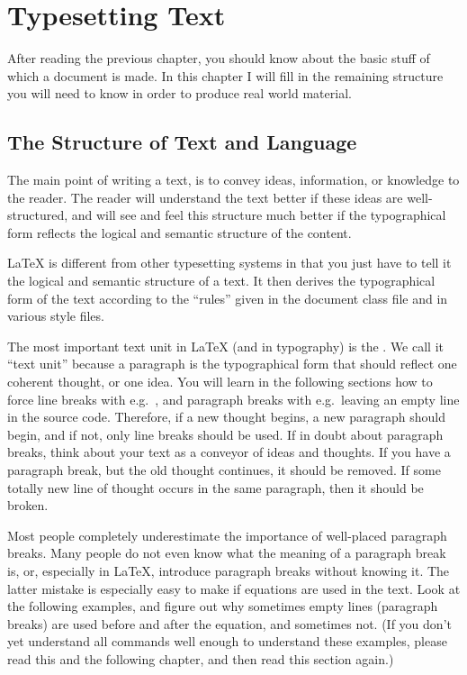 \chapter{Typesetting Text}

\begin{intro}
  After reading the previous chapter, you should know about the basic
  stuff of which a \LaTeXe{} document is made. In this chapter I
  will fill in the remaining structure you will need to know in order
  to produce real world material.
\end{intro}

\section{The Structure of Text and Language}
The main point of writing a text, is to convey ideas, information, or
knowledge to the reader.  The reader will understand the text better
if these ideas are well-structured, and will see and feel this
structure much better if the typographical form reflects the logical
and semantic structure of the content.

\LaTeX{} is different from other typesetting systems in that you just
have to tell it the logical and semantic structure of a text.  It
then derives the typographical form of the text according to the
``rules'' given in the document class file and in various style files.

The most important text unit in \LaTeX{} (and in typography) is the
.  We call it ``text unit'' because a paragraph is the
typographical form that should reflect one coherent thought, or one idea.
You will learn in the following sections how to force line breaks with
e.g.\ \texttt{\bs\bs}, and paragraph breaks with e.g.\ leaving an empty line
in the source code.  Therefore, if a new thought begins, a new paragraph
should begin, and if not, only line breaks should be used.  If in doubt
about paragraph breaks, think about your text as a conveyor of ideas and
thoughts.  If you have a paragraph break, but the old thought continues, it
should be removed.  If some totally new line of thought occurs in the same
paragraph, then it should be broken.

Most people completely underestimate the importance of well-placed
paragraph breaks.  Many people do not even know what the meaning of
a paragraph break is, or, especially in \LaTeX, introduce paragraph
breaks without knowing it.  The latter mistake is especially easy to
make if equations are used in the text.  Look at the following
examples, and figure out why sometimes empty lines (paragraph breaks)
are used before and after the equation, and sometimes not.  (If you
don't yet understand all commands well enough to understand these
examples, please read this and the following chapter, and then read
this section again.)

